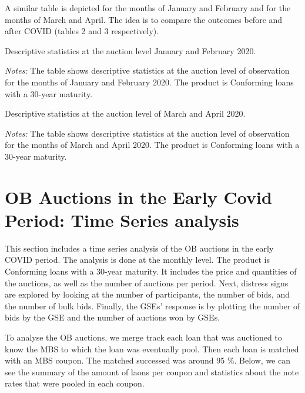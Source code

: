 \documentclass[11pt,a4paper]{article}
\begin{document}
A similar table is depicted for the months of January and February and for the months of March and April. The idea is to compare the outcomes before and after COVID (tables 2 and 3 respectively).

\begin{table}[h]
  \centering
  
  \caption{Descriptive statistics at the auction level January and February 2020. }
  \begin{minipage}{\textwidth}
      \footnotesize{\textit{Notes:} The table shows descriptive statistics at the auction level of observation for the months of January and  February 2020. The product is Conforming loans with a 30-year maturity. } 
      \end{minipage}
\end{table}

\begin{table}[h]
  \centering
  
  \caption{Descriptive statistics at the auction level of March and April 2020. }
  \begin{minipage}{\textwidth}
      \footnotesize{\textit{Notes:} The table shows descriptive statistics at the auction level of observation for the months of March and April 2020. The product is Conforming loans with a 30-year maturity. } 
      \end{minipage}
\end{table}

\pagebreak
\section{OB Auctions in the Early Covid Period: Time Series analysis}

This section includes a time series analysis of the OB auctions in the early COVID period. The analysis is done at the monthly level. The product is Conforming loans with a 30-year maturity. It includes the price and quantities of the auctions, as well as the number of auctions per period. Next, distress signs are explored by looking at the number of participants, the number of bids, and the number of bulk bids. Finally, the GSEs' response is by plotting the number of bids by the GSE and the number of auctions won by GSEs.

To analyse the OB auctions, we merge track each loan that was auctioned to know the MBS to which the loan was eventually pool. Then each loan is matched with an MBS coupon. The matched successed was around 95 \%. Below, we can see the summary of the amount of laons per coupon and statistics about the note rates that were pooled in each coupon. 
\end{document}
